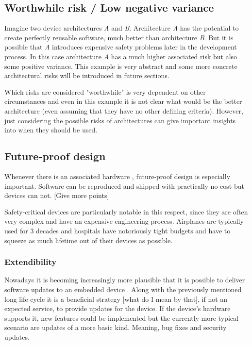 \subsection{Worthwhile risk / Low negative variance}
Imagine two device architectures \textit{A} and \textit{B}. Architecture \textit{A} has the potential to create perfectly reusable software, much better than architecture \textit{B}. But it is possible that \textit{A} introduces expensive safety problems later in the development process.
In this case architecture \textit{A} has a much higher associated risk but also  some positive variance. This example is very abstract and some more concrete architectural risks will be introduced in future sections. 

Which risks are considered "worthwhile" is very dependent on other circumstances and even in this example it is not clear what would be the better architecture (even assuming that they have no other defining criteria). However, just considering the possible risks of architectures can give important insights into when they should be used.

\subsection{Future-proof design}
Whenever there is an associated hardware , future-proof design is especially important. Software can be reproduced and shipped with practically no cost but devices can not. [Give more points]

Safety-critical devices are particularly notable in this respect, since they are often very complex and have an expensive engineering process. Airplanes are typically used for 3 decades and hospitals have notoriously tight budgets and have to squeeze as much lifetime out of their devices as possible. 
\subsubsection{Extendibility}
Nowadays it is becoming increasingly more plausible that it is possible to deliver software updates to an embedded device \cite{OndrejKachman.2016}. Along with the previously mentioned long life cycle it is a beneficial strategy [what do I mean by that], if not an expected service, to provide updates for the device.
If the device's hardware supports it, new features could be implemented but the currently more typical scenario are updates of a more basic kind. Meaning, bug fixes and security updates.


